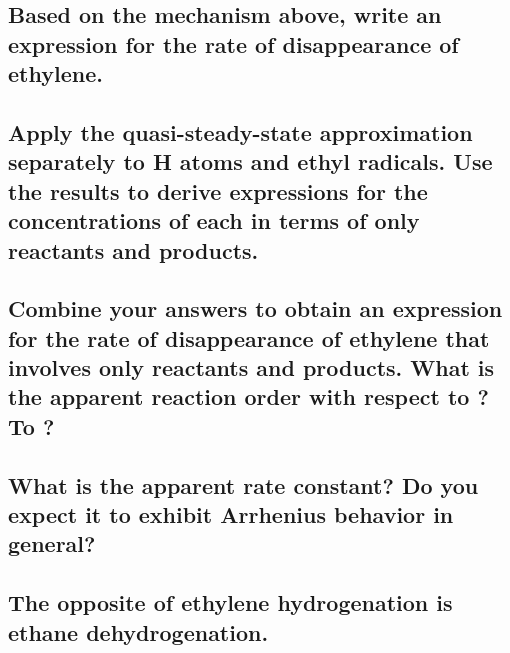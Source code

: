\documentclass[11pt]{article}
\begin{document}
\subsection{Based on the mechanism above, write an expression for the rate of disappearance of ethylene.}
\label{sec:org4df9fb4}

\subsection{Apply the quasi-steady-state approximation separately to H atoms and ethyl radicals.  Use the results to derive expressions for the concentrations of each in terms of only reactants and products.}
\label{sec:orgcfee2df}

\subsection{Combine your answers to  obtain an expression for the rate of disappearance of ethylene that involves only reactants and products.  What is the apparent reaction order with respect to ?  To ?}
\label{sec:orga7da0a5}

\subsection{What is the apparent rate constant?  Do you expect it to exhibit Arrhenius behavior in general?}
\label{sec:org31f162a}

\subsection{The opposite of ethylene hydrogenation is ethane dehydrogenation.}
\label{sec:org05c4d45}
\end{document}
